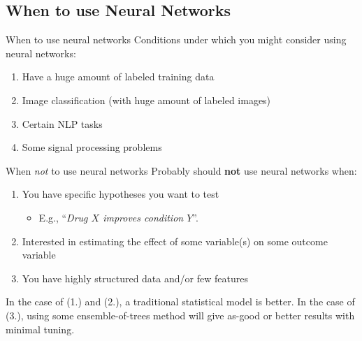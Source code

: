\documentclass[pdf]{beamer}
\begin{document}
\subsection{When to use Neural Networks}
	\begin{frame}{When to use neural networks}
		Conditions under which you might consider using neural networks:
		\begin{enumerate}
			\item Have a huge amount of labeled training data
			\item Image classification (with huge amount of labeled images)
			\item Certain NLP tasks
			\item Some signal processing problems
		\end{enumerate}
	\end{frame}

	\begin{frame}{When \textit{not} to use neural networks}
		Probably should \textbf{not} use neural networks when:
		\vspace{1em}
		\begin{enumerate}
			\item You have specific hypotheses you want to test
				\begin{itemize}
					\item E.g., ``\textit{Drug $X$ improves condition $Y$}''.
				\end{itemize}
			\item Interested in estimating the effect of some variable(s) on some outcome variable
			\item You have highly structured data and/or few features
		\end{enumerate}
		
		\vspace{2em}
		
		In the case of (1.) and (2.), a traditional statistical model is better. In the case of (3.), using some ensemble-of-trees method will give as-good or better results with minimal tuning.
	\end{frame}
\end{document}
